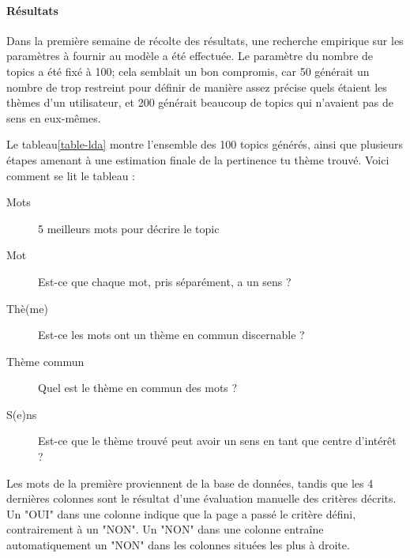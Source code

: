 			\paragraph{Résultats}

				Dans la première semaine de récolte des résultats, une recherche empirique sur les paramètres à fournir au modèle a été effectuée. Le paramètre du nombre de topics a été fixé à 100; cela semblait un bon compromis, car 50 générait un nombre de trop restreint pour définir de manière assez précise quels étaient les thèmes d'un utilisateur, et 200 générait beaucoup de topics qui n'avaient pas de sens en eux-mêmes.

				Le tableau\ref{table-lda} montre l'ensemble des 100 topics générés, ainsi que plusieurs étapes amenant à une estimation finale de la pertinence tu thème trouvé. Voici comment se lit le tableau :
				\begin{description}
					\item[Mots] 5 meilleurs mots pour décrire le topic
					\item[Mot] Est-ce que chaque mot, pris séparément, a un sens ?
					\item[Thè(me)] Est-ce les mots ont un thème en commun discernable ?
					\item[Thème commun] Quel est le thème en commun des mots ?
					\item[S(e)ns] Est-ce que le thème trouvé peut avoir un sens en tant que centre d'intérêt ?
				\end{description}

				Les mots de la première proviennent de la base de données, tandis que les 4 dernières colonnes sont le résultat d'une évaluation manuelle des critères décrits. Un "OUI" dans une colonne indique que la page a passé le critère défini, contrairement à un "NON". Un "NON" dans une colonne entraîne automatiquement un "NON" dans les colonnes situées les plus à droite.

